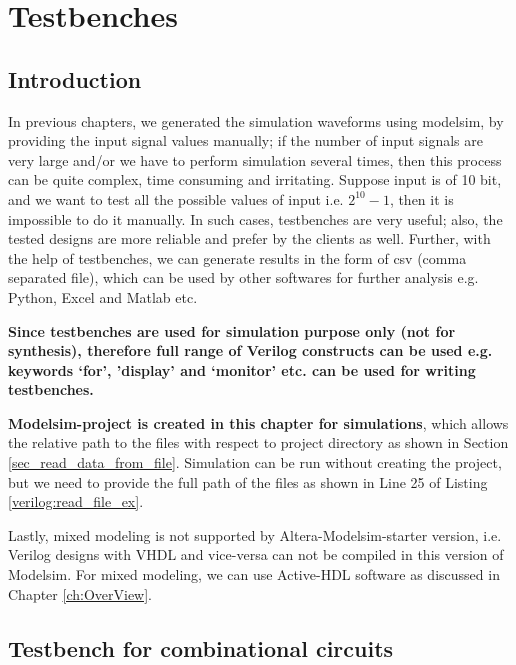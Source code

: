 \chapter{Testbenches} \label{ch:Testbenches}

\graphicspath{{Chapters/Testbenches/Figures/}}

\section{Introduction}

In previous chapters, we generated the simulation waveforms using modelsim, by providing the input signal values manually; if the number of input signals are very large and/or we have to perform simulation several times, then this process can be quite complex, time consuming and irritating. Suppose input is of 10 bit, and we want to test all the possible values of input i.e. $2^{10}-1$, then it is impossible to do it manually. In such cases, testbenches are very useful; also, the tested designs are more reliable and prefer by the clients as well. Further, with the help of testbenches, we can generate results in the form of csv (comma separated file), which can be used by other softwares for further analysis e.g. Python, Excel and Matlab etc.  

\textbf{Since testbenches are used for simulation purpose only (not for synthesis), therefore full range of Verilog constructs can be used e.g. keywords `for', 'display' and `monitor' etc. can be used for writing testbenches.}

\textbf{Modelsim-project is created in this chapter for simulations}, which allows the relative path to the files with respect to project directory as shown in Section \ref{sec_read_data_from_file}. Simulation can be run without creating the project, but we need to provide the full path of the files as shown in Line 25  of Listing \ref{verilog:read_file_ex}. 

Lastly, mixed modeling is not supported by Altera-Modelsim-starter version, i.e. Verilog designs with VHDL and vice-versa can not be compiled in this version of Modelsim. For mixed modeling, we can use Active-HDL software as discussed in Chapter \ref{ch:OverView}.

\section{Testbench for combinational circuits}

